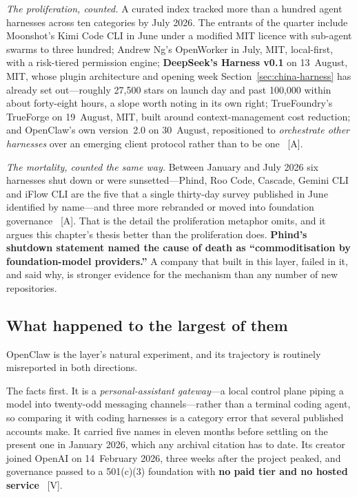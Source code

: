 \emph{The proliferation, counted.} A curated index tracked more than a hundred agent harnesses across ten categories by July 2026. The entrants of the quarter include Moonshot's Kimi Code CLI in June under a modified MIT licence with sub-agent swarms to three hundred; Andrew Ng's OpenWorker in July, MIT, local-first, with a risk-tiered permission engine; \textbf{DeepSeek's Harness v0.1} on 13~August, MIT, whose plugin architecture and opening week Section~\ref{sec:china-harness} has already set out---roughly 27,500 stars on launch day and past 100,000 within about forty-eight hours, a slope worth noting in its own right; TrueFoundry's TrueForge on 19~August, MIT, built around context-management cost reduction; and OpenClaw's own version~2.0 on 30~August, repositioned to \emph{orchestrate other harnesses} over an emerging client protocol rather than to be one~\cite{harness-field} [A].

\emph{The mortality, counted the same way.} Between January and July 2026 six harnesses shut down or were sunsetted---Phind, Roo Code, Cascade, Gemini CLI and iFlow CLI are the five that a single thirty-day survey published in June identified by name---and three more rebranded or moved into foundation governance~\cite{harness-mortality} [A]. That is the detail the proliferation metaphor omits, and it argues this chapter's thesis better than the proliferation does. \textbf{Phind's shutdown statement named the cause of death as ``commoditisation by foundation-model providers.''} A company that built in this layer, failed in it, and said why, is stronger evidence for the mechanism than any number of new repositories.

\subsection{What happened to the largest of them}

OpenClaw is the layer's natural experiment, and its trajectory is routinely misreported in both directions.

The facts first. It is a \emph{personal-assistant gateway}---a local control plane piping a model into twenty-odd messaging channels---rather than a terminal coding agent, so comparing it with coding harnesses is a category error that several published accounts make. It carried five names in eleven months before settling on the present one in January 2026, which any archival citation has to date. Its creator joined OpenAI on 14~February 2026, three weeks after the project peaked, and governance passed to a 501(c)(3) foundation with \textbf{no paid tier and no hosted service}~\cite{openclaw} [V].

